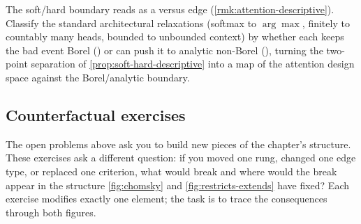 \begin{openprob}
\label{op:attention-restricts-descriptive}
The soft/hard boundary reads as a  versus  edge (\cref{rmk:attention-descriptive}). Classify the standard architectural relaxations (softmax to $\arg\max$, finitely to countably many heads, bounded to unbounded context) by whether each keeps the bad event Borel () or can push it to analytic non-Borel (), turning the two-point separation of \cref{prop:soft-hard-descriptive} into a map of the attention design space against the Borel/analytic boundary.
\end{openprob}

\subsection*{Counterfactual exercises}

The open problems above ask you to build new pieces of the chapter's structure. These exercises ask a different question: if you moved one rung, changed one edge type, or replaced one criterion, what would break and where would the break appear in the structure \cref{fig:chomsky} and \cref{fig:restricts-extends} have fixed? Each exercise modifies exactly one element; the task is to trace the consequences through both figures.

